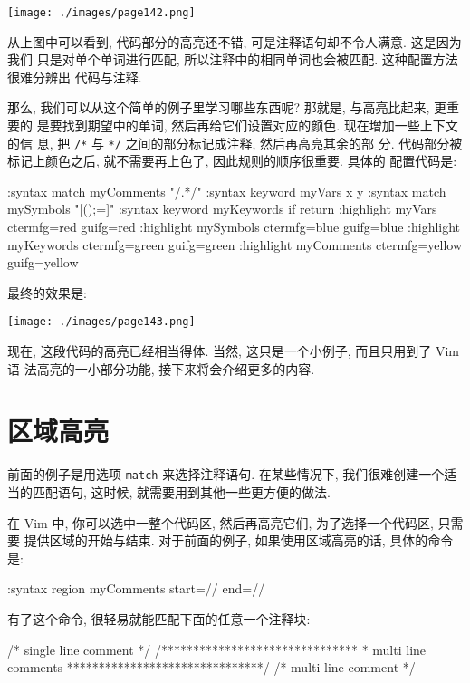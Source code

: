 \begin{center}
    \texttt{[image: ./images/page142.png]}
\end{center}

从上图中可以看到, 代码部分的高亮还不错, 可是注释语句却不令人满意. 这是因为我们
只是对单个单词进行匹配, 所以注释中的相同单词也会被匹配. 这种配置方法很难分辨出
代码与注释.

那么, 我们可以从这个简单的例子里学习哪些东西呢? 那就是, 与高亮比起来, 更重要的
是要找到期望中的单词, 然后再给它们设置对应的颜色. 现在增加一些上下文的信
息, 把 \verb'/*' 与 \verb'*/' 之间的部分标记成注释, 然后再高亮其余的部
分. 代码部分被标记上颜色之后, 就不需要再上色了, 因此规则的顺序很重要. 具体的
配置代码是:
\begin{vimcode}
:syntax match myComments "/\*.*\*/"
:syntax keyword myVars x y
:syntax match mySymbols "[{}();=]"
:syntax keyword myKeywords if return
:highlight myVars ctermfg=red guifg=red
:highlight mySymbols ctermfg=blue guifg=blue
:highlight myKeywords ctermfg=green guifg=green
:highlight myComments ctermfg=yellow guifg=yellow
\end{vimcode}
最终的效果是:
\begin{center}
\texttt{[image: ./images/page143.png]}
\end{center}

现在, 这段代码的高亮已经相当得体. 当然, 这只是一个小例子, 而且只用到了 Vim 语
法高亮的一小部分功能, 接下来将会介绍更多的内容.

\section{区域高亮}
\label{sec:syntax_regions}

前面的例子是用选项 \texttt{match} 来选择注释语句. 在某些情况下,
我们很难创建一个适当的匹配语句, 这时候, 就需要用到其他一些更方便的做法.

在 Vim 中, 你可以选中一整个代码区, 然后再高亮它们, 为了选择一个代码区, 只需要
提供区域的开始与结束. 对于前面的例子, 如果使用区域高亮的话, 具体的命令是:
\begin{vimcode}
:syntax region myComments start=/\/\*/ end=/\*\//
\end{vimcode}
有了这个命令, 很轻易就能匹配下面的任意一个注释块:
\begin{vimcode}
/* single line comment */
/*******************************
 *  multi line comments
 *******************************/
/* multi line comment
 */
\end{vimcode}

